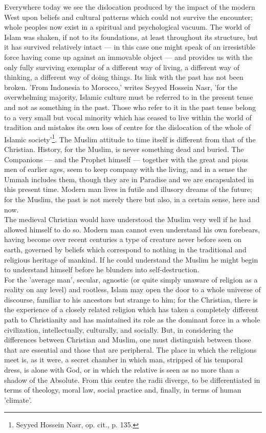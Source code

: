 \documentclass[10pt, twoside]{book}
\begin{document}
Everywhere today we see the dislocation produced by the impact of the modern West upon beliefs and cultural patterns which could not survive the encounter; whole peoples now exist in a spiritual and psychological vacuum. The world of Islam was shaken, if not to its foundations, at least throughout its structure, but it has survived relatively intact --- in this case one might speak of an irresistible force having come up against an immovable object --- and provides us with the only fully surviving exemplar of a different way of living, a different way of thinking, a different way of doing things. Its link with the past has not been broken. 'From Indonesia to Morocco,' writes Seyyed Hossein Nasr, 'for the overwhelming majority, Islamic culture must be referred to in the present tense and not as something in the past. Those who refer to it in the past tense belong to a very small but vocal minority which has ceased to live within the world of tradition and mistakes its own loss of centre for the dislocation of the whole of Islamic society'\footnote{Seyyed Hossein Nasr, op. cit., p. 135.}. The Muslim attitude to time itself is different from that of the Christian. History, for the Muslim, is never something dead and buried. The Companions --- and the Prophet himself --- together with the great and pious men of earlier ages, seem to keep company with the living, and in a sense the Ummah includes them, though they are in Paradise and we are encapsulated in this present time. Modern man lives in futile and illusory dreams of the future; for the Muslim, the past is not merely there but also, in a certain sense, here and now. \\

The medieval Christian would have understood the Muslim very well if he had allowed himself to do so. Modern man cannot even understand his own forebears, having become over recent centuries a type of creature never before seen on earth, governed by beliefs which correspond to nothing in the traditional and religious heritage of mankind. If he could understand the Muslim he might begin to understand himself before he blunders into self\hyp{}destruction. \\

For the 'average man', secular, agnostic (or quite simply unaware of religion as a reality on any level) and rootless, Islam may open the door to a whole universe of discourse, familiar to his ancestors but strange to him; for the Christian, there is the experience of a closely related religion which has taken a completely different path to Christianity and has maintained its role as the dominant force in a whole civilization, intellectually, culturally, and socially. But, in considering the differences between Christian and Muslim, one must distinguish between those that are essential and those that are peripheral. The place in which the religions meet is, as it were, a secret chamber in which man, stripped of his temporal dress, is alone with God, or in which the relative is seen as no more than a shadow of the Absolute. From this centre the radii diverge, to be differentiated in terms of theology, moral law, social practice and, finally, in terms of human 'climate'. \\
\end{document}
